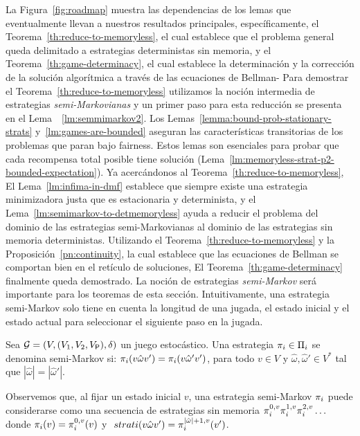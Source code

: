 La Figura~\ref{fig:roadmap} muestra las dependencias de los lemas que eventualmente llevan a nuestros resultados principales, específicamente, el Teorema~\ref{th:reduce-to-memoryless}, el cual establece que el problema general queda delimitado a estrategias deterministas sin memoria, y el Teorema~\ref{th:game-determinacy}, el cual establece la determinación y la corrección de la solución algorítmica a través de las ecuaciones de Bellman-
Para demostrar el Teorema~\ref{th:reduce-to-memoryless} utilizamos la noción intermedia de estrategias \emph{semi-Markovianas} \cite{FilarV96} y un primer paso para esta reducción se presenta en el Lema~~\ref{lm:semmimarkov2}.
Los Lemas~\ref{lemma:bound-prob-stationary-strats}
y~\ref{lm:games-are-bounded} aseguran las características transitorias de los problemas que paran bajo fairness.  Estos lemas son esenciales para probar que cada recompensa total posible tiene solución
(Lema~\ref{lm:memoryless-strat-p2-bounded-expectation}).  Ya acercándonos al Teorema~\ref{th:reduce-to-memoryless},
El Lema~\ref{lm:infima-in-dmf} establece que siempre existe una estrategia minimizadora justa que es estacionaria y determinista, y
el Lema~\ref{lm:semimarkov-to-detmemoryless} ayuda a reducir el problema del dominio de las estrategias semi-Markovianas al dominio de las estrategias sin memoria deterministas.  Utilizando el Teorema~\ref{th:reduce-to-memoryless}
y la Proposición~\ref{pn:continuity}, la cual establece que las ecuaciones de Bellman se comportan bien en el retículo de soluciones,
El Teorema~\ref{th:game-determinacy} finalmente queda demostrado.
La noción de estrategias \emph{semi-Markov} \cite{FilarV96} será importante para los teoremas de esta sección. Intuitivamente, una estrategia semi-Markov solo tiene en cuenta la longitud de una jugada, el estado inicial y el estado actual para seleccionar el siguiente paso en la jugada.
        
\begin{definition}\label{def:semimarkov:strategy} Sea $\mathcal{G} = (V, (V_1, V_2, V_{\mathsf{P}}), \delta)$ un juego estocástico. Una estrategia $\pi_{i} \in \Pi_{i}$ se denomina semi-Markov si: $\pi_{i}(v \hat{\omega}v') = \pi_{i}(v \hat{\omega}'v')$, para todo $v \in V$ y $\hat{\omega}, \hat{\omega}' \in V^*$ tal que $|\hat{\omega}|=|\hat{\omega}'|$. 
\end{definition}


Observemos que, al fijar un estado inicial $v$, una estrategia semi-Markov $\pi_{i}$ puede considerarse como una secuencia de estrategias sin memoria $\pi_{i}^{0,v}\pi_{i }^{1,v}\pi_{i}^{2,v}\ldots$ donde $\pi_{i}(v)=\pi_{i}^{0,v}(v)$ y $\ strat{i}(v\hat{\omega}v')=\strat{i}^{|\hat{\omega}|+1,v}(v')$.



